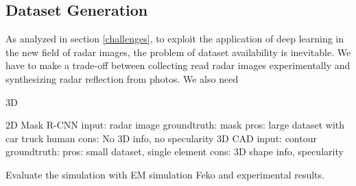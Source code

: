 \subsection{Dataset Generation}
As analyzed in section \ref{challenges}, to exploit the application of deep learning in the new field of radar images, the problem of dataset availability is inevitable. We have to make a trade-off between collecting read radar images experimentally and synthesizing radar reflection from photos. We also need 

3D %

2D
	Mask R-CNN
		input: radar image
		groundtruth: mask
	pros: large dataset with car truck human 
	cons: No 3D info, no specularity
	3D CAD
		input: contour
		groundtruth:
	pros: small dataset, single element 
	cons: 3D shape info, specularity 


Evaluate the simulation with EM simulation Feko and experimental results.

